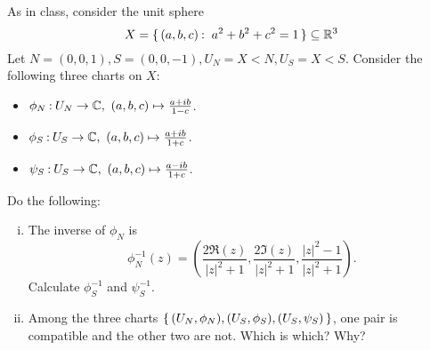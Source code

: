 \documentclass[12pt]{memoir}
\begin{document}
\begin{Ej}
    As in class, consider the unit sphere
    $$X=\set{(a,b,c)\:\ a^2+b^2+c^2=1}\subseteq\bR^3$$
    Let $N = (0, 0, 1), S = (0, 0, -1), U_N = X\less N, U_S = X\less S$. Consider the following three
    charts on $X$:
    \begin{itemize}
        \item $\phi_N\: U_N\to\bC,\ (a,b,c)\mapsto\frac{a+ib}{1-c}$.
        \item $\phi_S\: U_S\to\bC,\ (a,b,c)\mapsto\frac{a+ib}{1+c}$.
        \item $\psi_S\: U_S\to\bC,\ (a,b,c)\mapsto\frac{a-ib}{1+c}$.
    \end{itemize}
    Do the following:
    \begin{enumerate}[i)]
        \itemsep=-0.4em
        \item The inverse of $\phi_N$ is 
        $$\phi_N^{-1}(z)=\left(\frac
        {2\Re(z)}{|z|^2+1},\frac
        {2\Im(z)}{|z|^2+1},\frac
        {|z|^2-1}{|z|^2+1}\right).$$
        Calculate $\phi_S^{-1}$ and $\psi_S^{-1}$.
        \item Among the three charts $\{\,(U_N,\phi_N),(U_S,\phi_S),(U_S,\psi_S)\,\}$, one pair is compatible and the other two are not. Which is which? Why?\par 
    \end{enumerate}
\end{Ej}
\end{document}
